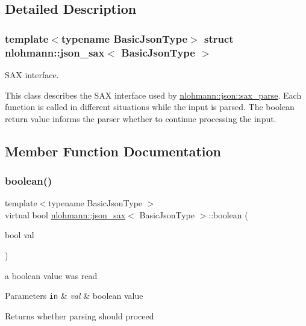 \subsection{Detailed Description}
\subsubsection*{template$<$typename Basic\+Json\+Type$>$\newline
struct nlohmann\+::json\+\_\+sax$<$ Basic\+Json\+Type $>$}

S\+AX interface. 

This class describes the S\+AX interface used by \hyperlink{classnlohmann_1_1basic__json_a8a3dd150c2d1f0df3502d937de0871db}{nlohmann\+::json\+::sax\+\_\+parse}. Each function is called in different situations while the input is parsed. The boolean return value informs the parser whether to continue processing the input. 

\subsection{Member Function Documentation}
\mbox{\label{structnlohmann_1_1json__sax_a82ed080814fa656191a537284bb0c575}} 
\subsubsection{\texorpdfstring{boolean()}{boolean()}}
{\footnotesize\ttfamily template$<$typename Basic\+Json\+Type $>$ \\
virtual bool \hyperlink{structnlohmann_1_1json__sax}{nlohmann\+::json\+\_\+sax}$<$ Basic\+Json\+Type $>$\+::boolean (\begin{DoxyParamCaption}\item[{bool}]{val }\end{DoxyParamCaption})\hspace{0.3cm}{\ttfamily [pure virtual]}}



a boolean value was read 


\begin{DoxyParams}[1]{Parameters}
\mbox{\tt in}  & {\em val} & boolean value \\
\hline
\end{DoxyParams}
\begin{DoxyReturn}{Returns}
whether parsing should proceed 
\end{DoxyReturn}
\mbox{\label{structnlohmann_1_1json__sax_a235ee975617f28e6a996d1e36a282312}} 
